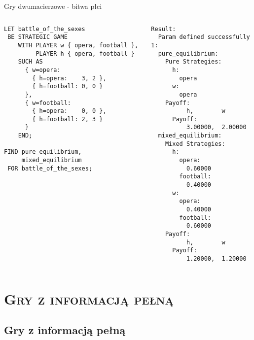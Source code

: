 \documentclass[xcolor=x11names,compress]{beamer}
\renewcommand{\(}{\begin{columns}}
\renewcommand{\)}{\end{columns}}
\newcommand{\<}[1]{\begin{column}{#1}}
\renewcommand{\>}{\end{column}}
\begin{document}
\begin{frame}[fragile]{Gry dwumacierzowe - bitwa płci}
\begin{columns}[c]
\begin{column}{.5\textwidth}
\begin{lstlisting}
LET battle_of_the_sexes
 BE STRATEGIC GAME
    WITH PLAYER w { opera, football },
         PLAYER h { opera, football }
    SUCH AS
      { w=opera:
        { h=opera:    3, 2 },
        { h=football: 0, 0 }
      },
      { w=football:
        { h=opera:    0, 0 },
        { h=football: 2, 3 }
      }
    END;
    
FIND pure_equilibrium,
     mixed_equilibrium
 FOR battle_of_the_sexes;
\end{lstlisting}
\end{column}
\vrule
\begin{column}{.5\textwidth}
\begin{lstlisting}
Result:
  Param defined successfully
1:
  pure_equilibrium:
    Pure Strategies:
      h:
        opera
      w:
        opera
    Payoff:
          h,        w
      Payoff:
          3.00000,  2.00000
  mixed_equilibrium:
    Mixed Strategies:
      h:
        opera:
          0.60000
        football:
          0.40000
      w:
        opera:
          0.40000
        football:
          0.60000
    Payoff:
          h,        w
      Payoff:
          1.20000,  1.20000
\end{lstlisting}
\end{column}
\end{columns}
\end{frame}


\section{\scshape Gry z informacją pełną}
\subsection{Gry z informacją pełną}
\end{document}
